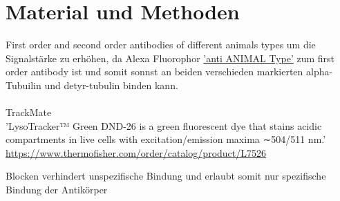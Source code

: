 \section{Material und Methoden}
First order and second order antibodies of different animals types um die Signalstärke zu erhöhen, da Alexa Fluorophor \underline{'anti ANIMAL Type'} zum  first order antibody ist und somit sonnst an beiden verschieden markierten alpha-Tubuilin und detyr-tubulin binden kann.\\\\
TrackMate \cite{Ershov_2021} \cite{Tinevez_2017} \\
'LysoTracker™ Green DND-26 is a green fluorescent dye that stains acidic compartments in live cells with excitation/emission maxima ∼504/511 nm.' \url{https://www.thermofisher.com/order/catalog/product/L7526}

Blocken verhindert unspezifische Bindung und erlaubt somit nur spezifische Bindung der Antikörper 

\newpage